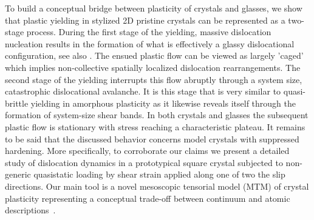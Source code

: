 \documentclass[aps,
superscriptaddress,notitlepage]{revtex4-1}
\begin{document}
To build a conceptual bridge  between plasticity of crystals and glasses,  we  show that plastic yielding in stylized 2D  pristine crystals can be represented as a two-stage process.  During the first stage of the yielding,  massive dislocation nucleation results in the formation of what is effectively a glassy dislocational configuration, see also  \cite{Lehtinen2016-qy,Sethna2017,Ovaska2017}.
 The ensued plastic flow  can be  viewed as largely 'caged'  which implies  non-collective  spatially localized dislocation rearrangements.  The second stage of the yielding interrupts this  flow abruptly through a system size, catastrophic  dislocational avalanche. It is this stage  that is  very similar to quasi-brittle yielding  in amorphous plasticity as it likewise  reveals itself through the   formation of  system-size  shear bands. In both crystals and glasses the subsequent plastic flow is stationary with stress reaching a characteristic plateau. It remains to be said that the discussed behavior concerns model crystals with suppressed hardening. More specifically, 
 to corroborate our claims we present a detailed study of  dislocation dynamics  in  a prototypical  square crystal  subjected to non-generic quasistatic loading by shear strain applied  along one of two the slip directions. Our main tool is a novel mesoscopic tensorial model  (MTM) of crystal plasticity representing a conceptual trade-off between continuum  and atomic descriptions~\cite{Salman2011,Salman2012b,Baggio2019,Salman2021,perchikov2024,Baggio2023,Baggio2023-qu,Zhang2020-ax}.
\end{document}
